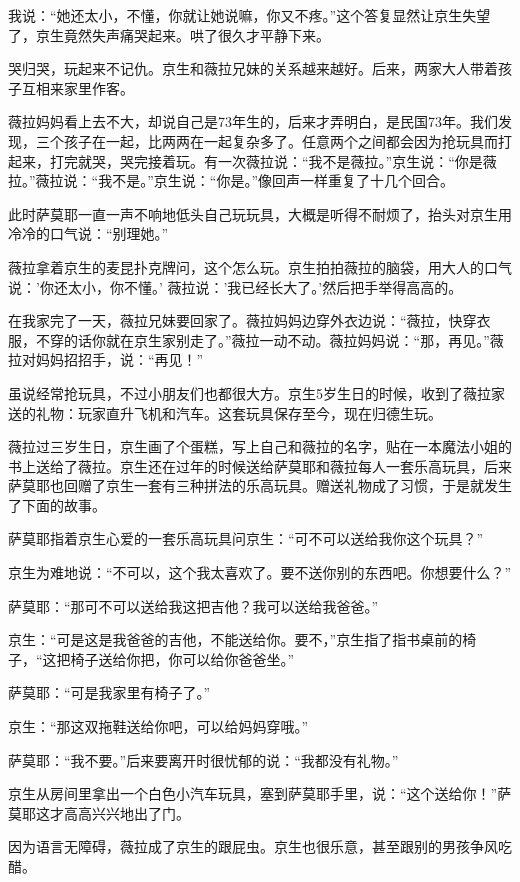 \documentclass[twoside,openright,headings=optiontohead]{ctexbook} %
\begin{document}
{我说：``她还太小，不懂，你就让她说嘛，你又不疼。''这个答复显然让京生失望了，京生竟然失声痛哭起来。哄了很久才平静下来。

哭归哭，玩起来不记仇。京生和薇拉兄妹的关系越来越好。后来，两家大人带着孩子互相来家里作客。

薇拉妈妈看上去不大，却说自己是73年生的，后来才弄明白，是民国73年。我们发现，三个孩子在一起，比两两在一起复杂多了。任意两个之间都会因为抢玩具而打起来，打完就哭，哭完接着玩。有一次薇拉说：``我不是薇拉。''京生说：``你是薇拉。''薇拉说：``我不是。''京生说：``你是。''像回声一样重复了十几个回合。

此时萨莫耶一直一声不响地低头自己玩玩具，大概是听得不耐烦了，抬头对京生用冷冷的口气说：``别理她。''

薇拉拿着京生的麦昆扑克牌问，这个怎么玩。京生拍拍薇拉的脑袋，用大人的口气说：'你还太小，你不懂。'
薇拉说：'我已经长大了。'然后把手举得高高的。

在我家完了一天，薇拉兄妹要回家了。薇拉妈妈边穿外衣边说：``薇拉，快穿衣服，不穿的话你就在京生家别走了。''薇拉一动不动。薇拉妈妈说：``那，再见。''薇拉对妈妈招招手，说：``再见！''

虽说经常抢玩具，不过小朋友们也都很大方。京生5岁生日的时候，收到了薇拉家送的礼物：玩家直升飞机和汽车。这套玩具保存至今，现在归德生玩。

薇拉过三岁生日，京生画了个蛋糕，写上自己和薇拉的名字，贴在一本魔法小姐的书上送给了薇拉。京生还在过年的时候送给萨莫耶和薇拉每人一套乐高玩具，后来萨莫耶也回赠了京生一套有三种拼法的乐高玩具。赠送礼物成了习惯，于是就发生了下面的故事。

萨莫耶指着京生心爱的一套乐高玩具问京生：``可不可以送给我你这个玩具？''

京生为难地说：``不可以，这个我太喜欢了。要不送你别的东西吧。你想要什么？''

萨莫耶：``那可不可以送给我这把吉他？我可以送给我爸爸。''

京生：``可是这是我爸爸的吉他，不能送给你。要不，''京生指了指书桌前的椅子，``这把椅子送给你把，你可以给你爸爸坐。''

萨莫耶：``可是我家里有椅子了。''

京生：``那这双拖鞋送给你吧，可以给妈妈穿哦。''

萨莫耶：``我不要。''后来要离开时很忧郁的说：``我都没有礼物。''

京生从房间里拿出一个白色小汽车玩具，塞到萨莫耶手里，说：``这个送给你！''萨莫耶这才高高兴兴地出了门。

因为语言无障碍，薇拉成了京生的跟屁虫。京生也很乐意，甚至跟别的男孩争风吃醋。

}
\end{document}
